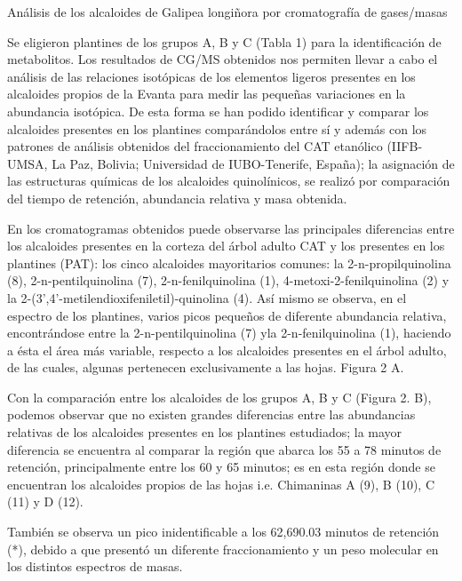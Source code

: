 \documentclass{article}
\begin{document}
Análisis de los alcaloides de Galipea longiñora por cromatografía de gases/masas

Se eligieron plantines de los grupos A, B y C (Tabla 1) para la identificación
de metabolitos. Los resultados de CG/MS obtenidos nos permiten llevar a cabo el
análisis de las relaciones isotópicas de los elementos ligeros presentes en los
alcaloides propios de la Evanta para medir las pequeñas variaciones en la
abundancia isotópica. De esta forma se han podido identificar y comparar los
alcaloides presentes en los plantines comparándolos entre sí y además con los
patrones de análisis obtenidos del fraccionamiento del CAT etanólico (IIFB-UMSA,
La Paz, Bolivia; Universidad de IUBO-Tenerife, España); la asignación de las
estructuras químicas de los alcaloides quinolínicos, se realizó por comparación
del tiempo de retención, abundancia relativa y masa obtenida.

En los cromatogramas obtenidos puede observarse las principales diferencias
entre los alcaloides presentes en la corteza del árbol adulto CAT y los
presentes en los plantines (PAT): los cinco alcaloides mayoritarios comunes: la
2-n-propilquinolina (8), 2-n-pentilquinolina (7), 2-n-fenilquinolina (1),
4-metoxi-2-fenilquinolina (2) y la 2-(3',4'-metilendioxifeniletil)-quinolina
(4). Así mismo se observa, en el espectro de los plantines, varios picos
pequeños de diferente abundancia relativa, encontrándose entre la
2-n-pentilquinolina (7) yla 2-n-fenilquinolina (1), haciendo a ésta el área más
variable, respecto a los alcaloides presentes en el árbol adulto, de las cuales,
algunas pertenecen exclusivamente a las hojas. Figura 2 A.

\begin{Center}

\end{Center}

Con la comparación entre los alcaloides de los grupos A, B y C (Figura 2. B),
podemos observar que no existen grandes diferencias entre las abundancias
relativas de los alcaloides presentes en los plantines estudiados; la mayor
diferencia se encuentra al comparar la región que abarca los 55 a 78 minutos de
retención, principalmente entre los 60 y 65 minutos; es en esta región donde se
encuentran los alcaloides propios de las hojas i.e. Chimaninas A (9), B (10), C
(11) y D (12).

También se observa un pico inidentificable a los 62,690.03 minutos de retención
(*), debido a que presentó un diferente fraccionamiento y un peso molecular en
los distintos espectros de masas.
\end{document}
